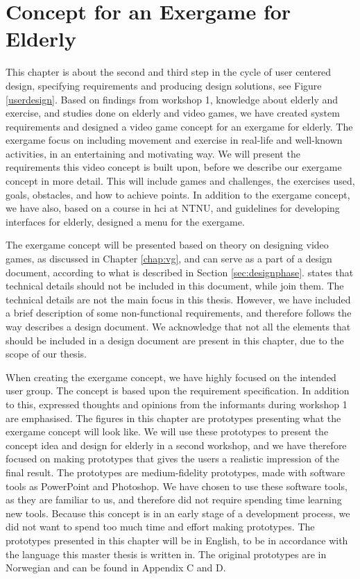 \chapter{Concept for an Exergame for Elderly}
\label{chap:concept}
This chapter is about the second and third step in the cycle of user centered design, specifying requirements and producing design solutions, see Figure \ref{userdesign}. Based on findings from workshop 1, knowledge about elderly and exercise, and studies done on elderly and video games, we have created system requirements and designed a video game concept for an exergame for elderly. The exergame focus on including movement and exercise in real-life and well-known activities, in an entertaining and motivating way. We will present the requirements this video concept is built upon, before we describe our exergame concept in more detail. This will include games and challenges, the exercises used, goals, obstacles, and how to achieve points. In addition to the exergame concept, we have also, based on a course in \ac{hci} at NTNU, and guidelines for developing interfaces for elderly, designed a menu for the exergame. 

The exergame concept will be presented based on theory on designing video games, as discussed in Chapter \ref{chap:vg}, and can serve as a part of a design document, according to what is described in Section \ref{sec:designphase}. \cite{gamedesign} states that technical details should not be included in this document, while \cite{understandingvg} join them. The technical details are not the main focus in this thesis. However, we have included a brief description of some non-functional requirements, and therefore follows the way \cite{understandingvg} describes a design document. We acknowledge that not all the elements that should be included in a design document are present in this chapter, due to the scope of our thesis.

When creating the exergame concept, we have highly focused on the intended user group. The concept is based upon the requirement specification. In addition to this, expressed thoughts and opinions from the informants during workshop 1 are emphasised. The figures in this chapter are prototypes presenting what the exergame concept will look like. We will use these prototypes to present the concept idea and design for elderly in a second workshop, and we have therefore focused on making prototypes that gives the users a realistic impression of the final result. The prototypes are medium-fidelity prototypes, made with software tools as PowerPoint and Photoshop. We have chosen to use these software tools, as they are familiar to us, and therefore did not require spending time learning new tools. Because this concept is in an early stage of a development process, we did not want to spend too much time and effort making prototypes. The prototypes presented in this chapter will be in English, to be in accordance with the language this master thesis is written in. The original prototypes are in Norwegian and can be found in Appendix C and D. 

